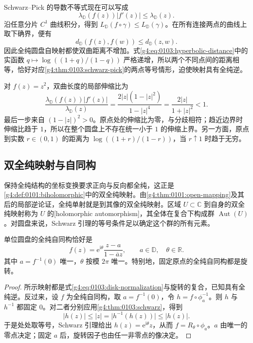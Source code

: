 Schwarz–Pick 的导数不等式现在可以写成
\[
	\lambda_{\mathbb D}(f(z))\lvert f'(z)\rvert
	\leq\lambda_{\mathbb D}(z).
\]
沿任意分片 \(C^1\) 曲线积分，得到 \(L_{\mathbb D}(f\circ\gamma)\leq L_{\mathbb D}(\gamma)\)。在所有连接两点的曲线上取下确界，便有
\begin{equation}
	\label{g4:eq:0103:hyperbolic-contraction}
	d_{\mathbb D}(f(z),f(w))\leq d_{\mathbb D}(z,w).
\end{equation}
因此全纯圆盘自映射都使双曲距离不增加。式\eqref{g4:eq:0103:hyperbolic-distance}中的实函数 \(q\mapsto\log((1+q)/(1-q))\) 严格递增，所以两个不同点间的距离相等，恰好对应\cref{g4:thm:0103:schwarz-pick}的两点等号情形，迫使映射具有全纯逆。

\begin{example}
	\label{g4:exm:0103:square-contraction}
	对 \(f(z)=z^2\)，双曲长度的局部伸缩比为
	\[
		\frac{\lambda_{\mathbb D}(f(z))\lvert f'(z)\rvert}
		{\lambda_{\mathbb D}(z)}
		=\frac{2\lvert z\rvert(1-\lvert z\rvert^2)}{1-\lvert z\rvert^4}
		=\frac{2\lvert z\rvert}{1+\lvert z\rvert^2}<1.
	\]
	最后一步来自 \((1-\lvert z\rvert)^2>0\)。原点处的伸缩比为零，与分歧相符；趋近边界时伸缩比趋于 \(1\)，所以在整个圆盘上不存在统一小于 \(1\) 的伸缩上界。另一方面，原点到实数 \(r\in(0,1)\) 的距离为 \(\log((1+r)/(1-r))\)，当 \(r\uparrow1\) 时趋于无穷。
\end{example}

\subsection{双全纯映射与自同构}
\label{g4:subsec:0103:04}
保持全纯结构的坐标变换要求正向与反向都全纯，这正是\cref{g4:def:0101:biholomorphic}中的双全纯映射。由\cref{g4:thm:0101:open-mapping}及其后的局部逆论证，全纯单射就是到其像的双全纯映射。区域 \(U\subset\mathbb C\) 到自身的双全纯映射称为 \(U\) 的[holomorphic automorphism]，其全体在复合下构成群 \(\operatorname{Aut}(U)\)。对圆盘来说，Schwarz 引理的等号条件足以确定这个群的所有元素。

\begin{theorem}
	\label{g4:thm:0103:disk-aut}
	单位圆盘的全纯自同构恰好是
	\[
		f(z)=\mathrm{e}^{\mathrm{i}\theta}\frac{z-a}{1-\overline a z},
		\qquad a\in\mathbb D,\quad\theta\in\mathbb R.
	\]
	其中 \(a=f^{-1}(0)\) 唯一，\(\theta\) 按模 \(2\pi\) 唯一。特别地，固定原点的全纯自同构都是旋转。
\end{theorem}

\begin{proof}
	所示映射都是式\eqref{g4:eq:0103:disk-normalization}与旋转的复合，已知具有全纯逆。反过来，设 \(f\) 为全纯自同构，取 \(a=f^{-1}(0)\)，令 \(h=f\circ\phi_a^{-1}\)。则 \(h\) 与 \(h^{-1}\) 都固定 \(0\)。对二者分别应用\cref{g4:thm:0103:schwarz}，得到
	\[
		\lvert h(z)\rvert\leq\lvert z\rvert
		=\lvert h^{-1}(h(z))\rvert\leq\lvert h(z)\rvert.
	\]
	于是处处取等号，Schwarz 引理给出 \(h(z)=\mathrm{e}^{\mathrm{i}\theta}z\)，从而 \(f=R_\theta\circ\phi_a\)。\(a\) 由唯一的零点决定；固定 \(a\) 后，旋转因子也由任一非零点的像决定。
\end{proof}

